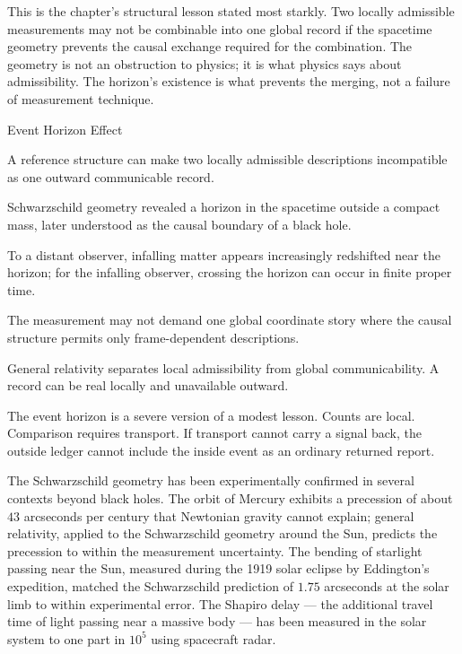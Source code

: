 This is the chapter's structural lesson stated most starkly. Two locally
admissible measurements may not be combinable into one global record if the
spacetime geometry prevents the causal exchange required for the
combination. The geometry is not an obstruction to physics; it is what
physics says about admissibility. The horizon's existence is what
prevents the merging, not a failure of measurement technique.

\begin{phenom}{Event Horizon Effect}
\label{ph:event-horizon-effect}

\PhStatement A reference structure can make two locally admissible descriptions
incompatible as one outward communicable record.

\PhOrigin Schwarzschild geometry revealed a horizon in the spacetime outside a
compact mass, later understood as the causal boundary of a black hole.

\PhObservation To a distant observer, infalling matter appears increasingly
redshifted near the horizon; for the infalling observer, crossing the horizon
can occur in finite proper time.

\PhConstraint The measurement may not demand one global coordinate story where
the causal structure permits only frame-dependent descriptions.

\PhConsequence General relativity separates local admissibility from global
communicability. A record can be real locally and unavailable outward.

\end{phenom}

The event horizon is a severe version of a modest lesson. Counts are local.
Comparison requires transport. If transport cannot carry a signal back, the
outside ledger cannot include the inside event as an ordinary returned report.

The Schwarzschild geometry has been experimentally confirmed in several
contexts beyond black holes. The orbit of Mercury exhibits a precession of
about $43$ arcseconds per century that Newtonian gravity cannot explain;
general relativity, applied to the Schwarzschild geometry around the Sun,
predicts the precession to within the measurement uncertainty. The bending
of starlight passing near the Sun, measured during the 1919 solar eclipse
by Eddington's expedition, matched the Schwarzschild prediction of $1{.}75$
arcseconds at the solar limb to within experimental error. The Shapiro
delay --- the additional travel time of light passing near a massive body
--- has been measured in the solar system to one part in $10^5$ using
spacecraft radar.

